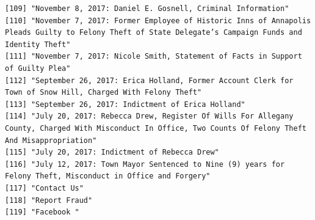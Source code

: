 \documentclass[
  letterpaper,
  DIV=11,
  numbers=noendperiod]{scrreprt}
\begin{document}
\begin{verbatim}
[109] "November 8, 2017: Daniel E. Gosnell, Criminal Information"                                                                                                                                                                                           
[110] "November 7, 2017: Former Employee of Historic Inns of Annapolis Pleads Guilty to Felony Theft of State Delegate’s Campaign Funds and Identity Theft"                                                                                                 
[111] "November 7, 2017: Nicole Smith, Statement of Facts in Support of Guilty Plea"                                                                                                                                                                        
[112] "September 26, 2017: Erica Holland, Former Account Clerk for Town of Snow Hill, Charged With Felony Theft"                                                                                                                                            
[113] "September 26, 2017: Indictment of Erica Holland"                                                                                                                                                                                                     
[114] "July 20, 2017: Rebecca Drew, Register Of Wills For Allegany County, Charged With Misconduct In Office, Two Counts Of Felony Theft And Misappropriation"                                                                                              
[115] "July 20, 2017: Indictment of Rebecca Drew"                                                                                                                                                                                                           
[116] "July 12, 2017: Town Mayor Sentenced to Nine (9) years for Felony Theft, Misconduct in Office and Forgery"                                                                                                                                            
[117] "Contact Us"                                                                                                                                                                                                                                          
[118] "Report Fraud"                                                                                                                                                                                                                                        
[119] "Facebook "                                                                                                                                                                                                                                           

\end{verbatim}
\end{document}
